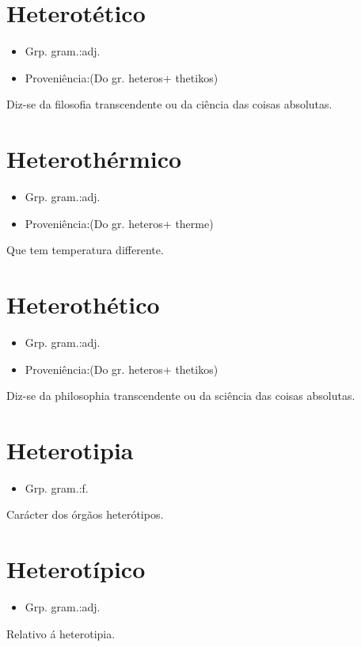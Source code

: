 \documentclass{article}
\begin{document}
\section{Heterotético}
\begin{itemize}
\item {Grp. gram.:adj.}
\end{itemize}
\begin{itemize}
\item {Proveniência:(Do gr. \textunderscore heteros\textunderscore  + \textunderscore thetikos\textunderscore )}
\end{itemize}
Diz-se da filosofia transcendente ou da ciência das coisas absolutas.
\section{Heterothérmico}
\begin{itemize}
\item {Grp. gram.:adj.}
\end{itemize}
\begin{itemize}
\item {Proveniência:(Do gr. \textunderscore heteros\textunderscore  + \textunderscore therme\textunderscore )}
\end{itemize}
Que tem temperatura differente.
\section{Heterothético}
\begin{itemize}
\item {Grp. gram.:adj.}
\end{itemize}
\begin{itemize}
\item {Proveniência:(Do gr. \textunderscore heteros\textunderscore  + \textunderscore thetikos\textunderscore )}
\end{itemize}
Diz-se da philosophia transcendente ou da sciência das coisas absolutas.
\section{Heterotipia}
\begin{itemize}
\item {Grp. gram.:f.}
\end{itemize}
Carácter dos órgãos heterótipos.
\section{Heterotípico}
\begin{itemize}
\item {Grp. gram.:adj.}
\end{itemize}
Relativo á heterotipia.
\end{document}
